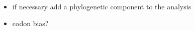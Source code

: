 \documentclass[12pt]{article}
\newcommand{\strep}{\textit{Streptomyces}\xspace}
\begin{document}
\begin{itemize}
%	
%	
%	
	\item if necessary add a phylogenetic component to the analysis
%	
%	
%	
%	
	
	\item codon bias?
	
%	
%	
%    
%    

	
\end{itemize}
\end{document}

